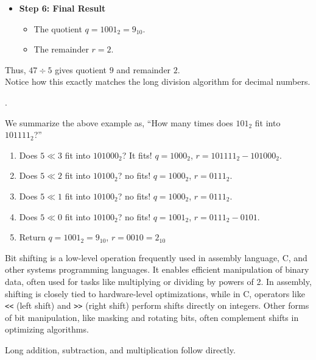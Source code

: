 \begin{itemize}
    \item \textbf{Step 6: Final Result}
    \begin{itemize}
        \item The quotient $q = 1001_2 = 9_{10}$.
        \item The remainder $r = 2$.
    \end{itemize}
\end{itemize}

\noindent
Thus, $47 \div 5$ gives quotient $9$ and remainder $2$.\\
Notice how this exactly matches the long division algorithm for decimal numbers.\\
\begin{center}
    .
\end{center}
We summarize the above example as, ``How many times does $101_2$ fit into $101111_2$?''
\begin{enumerate}
    \item  Does $5\ll 3$ fit into $101000_2$? It fits! $q=1000_2$, $r = 101111_2 - 101000_2$.
    \item  Does $5\ll 2$ fit into $10100_2$? no fits! $q=1000_2$, $r = 0111_2$.
    \item  Does $5\ll 1$ fit into $10100_2$? no fits! $q=1000_2$, $r = 0111_2$.
    \item  Does $5\ll 0$ fit into $10100_2$? no fits! $q=1001_2$, $r = 0111_2-0101$.
    \item  Return $q=1001_2=9_{10}$, $r = 0010 = 2_{10}$ 
\end{enumerate}

\begin{Tip}
    Bit shifting is a low-level operation frequently used in assembly language, C, and other systems programming languages. It enables efficient manipulation of binary data, often used for tasks like multiplying or dividing by powers of 2. In assembly, shifting is closely tied to hardware-level optimizations, while in C, operators like \texttt{<<} (left shift) and \texttt{>>} (right shift) perform shifts directly on integers. Other forms of bit manipulation, like masking and rotating bits, often complement shifts in optimizing algorithms.
\end{Tip}



\newpage 
\noindent
Long addition, subtraction, and multiplication follow directly.


